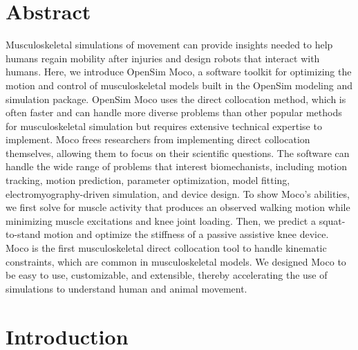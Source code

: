 \documentclass[10pt,letterpaper]{article}
\begin{document}
\section*{Abstract}
Musculoskeletal simulations of movement can provide insights needed to help humans regain mobility after injuries and design robots that interact with humans. Here, we introduce OpenSim Moco, a software toolkit for optimizing the motion and control of musculoskeletal models built in the OpenSim modeling and simulation package. OpenSim Moco uses the direct collocation method, which is often faster and can handle more diverse problems than other popular methods for musculoskeletal simulation but requires extensive technical expertise to implement. Moco frees researchers from implementing direct collocation themselves, allowing them to focus on their scientific questions. The software can handle the wide range of problems that interest biomechanists, including motion tracking, motion prediction, parameter optimization, model fitting, electromyography-driven simulation, and device design. To show Moco’s abilities, we first solve for muscle activity that produces an observed walking motion while minimizing muscle excitations and knee joint loading. Then, we predict a squat-to-stand motion and optimize the stiffness of a passive assistive knee device. Moco is the first musculoskeletal direct collocation tool to handle kinematic constraints, which are common in musculoskeletal models. We designed Moco to be easy to use, customizable, and extensible, thereby accelerating the use of simulations to understand human and animal movement.



\linenumbers

\section*{Introduction}
\end{document}
